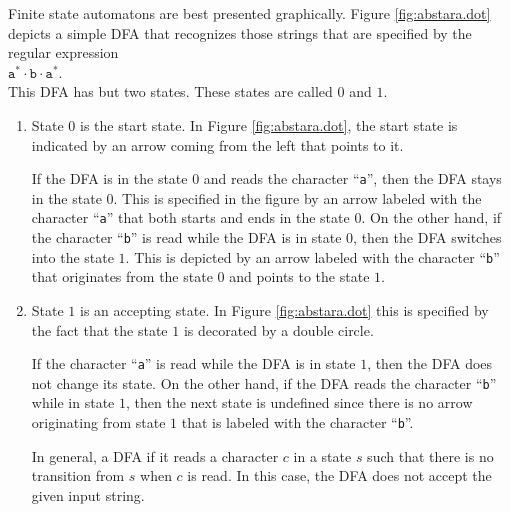 \noindent
Finite state automatons are best presented graphically.  Figure \ref{fig:abstara.dot} depicts a simple
\textsc{DFA} that recognizes those strings that are specified by the regular expression
\\[0.2cm]
\hspace*{1.3cm}
$\texttt{a}^*\cdot\texttt{b}\cdot\texttt{a}^*$.
\\[0.2cm]
This \textsc{DFA} has but two states.  These states are called $0$ and $1$.
\begin{enumerate}
\item State $0$  is the start state.  In Figure \ref{fig:abstara.dot}, the start state is indicated by an arrow
      coming from the left that points to it.  
  
      If the \textsc{DFA} is in the state $0$ and reads the character ``\texttt{a}'', then the
      \textsc{DFA} stays in the state $0$.  This is specified in the figure by an arrow labeled with the
      character ``\texttt{a}'' that both starts and ends in the state $0$.  On the other hand, if the
      character ``\texttt{b}'' is read while the \textsc{DFA} is in state 0, then the \textsc{DFA}
      switches into the state $1$.  This is depicted by an arrow labeled with the character
      ``\texttt{b}'' that originates from the state $0$ and points to the state $1$.
\item State  $1$ is an accepting state. In Figure \ref{fig:abstara.dot} this is specified by the
      fact that the state $1$ is decorated by a double circle.

      If the character ``\texttt{a}'' is read while the \textsc{DFA} is in state $1$, then the
      \textsc{DFA} does not change its state.  On the other hand, if the \textsc{DFA} reads the
      character ``\texttt{b}'' while in state $1$, then the next state is undefined since there is no
      arrow originating from state $1$ that is labeled with the character ``\texttt{b}''.

      In general, a \textsc{DFA}  
      if it reads a character $c$ in a state $s$ such that there is no transition from $s$ when $c$ is read.
      In this case, the \textsc{DFA} does not accept the given input string.
\end{enumerate}

